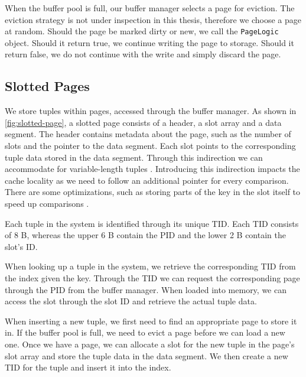 When the buffer pool is full, our buffer manager selects a page for eviction. 
The eviction strategy is not under inspection in this thesis, therefore we choose a page at random.
Should the page be marked dirty or new, we call the \texttt{PageLogic} object.
Should it return true, we continue writing the page to storage.
Should it return false, we do not continue with the write and simply discard the page.

\subsection*{Slotted Pages}

We store tuples within pages, accessed through the buffer manager.
As shown in \autoref{fig:slotted-page}, a slotted page consists of a header, a slot array and a data segment.
The header contains metadata about the page, such as the number of slots and the pointer to the data segment.
Each slot points to the corresponding tuple data stored in the data segment.
Through this indirection we can accommodate for variable-length tuples \cite{mdbs2024slides}.
Introducing this indirection impacts the cache locality as we need to follow an additional pointer for every comparison.
There are some optimizations, such as storing parts of the key in the slot itself to speed up comparisons \cite{graefe2014memory}.

Each tuple in the system is identified through its unique \ac{TID}.
Each \ac{TID} consists of 8 B, whereas the upper 6 B contain the \ac{PID} and the lower 2 B contain the slot's ID.

When looking up a tuple in the system, we retrieve the corresponding \ac{TID} from the index given the key.
Through the \ac{TID} we can request the corresponding page through the \ac{PID} from the buffer manager.
When loaded into memory, we can access the slot through the slot ID and retrieve the actual tuple data.

When inserting a new tuple, we first need to find an appropriate page to store it in.
If the buffer pool is full, we need to evict a page before we can load a new one.
Once we have a page, we can allocate a slot for the new tuple in the page's slot array and store the tuple data in the data segment.
We then create a new \ac{TID} for the tuple and insert it into the index.

